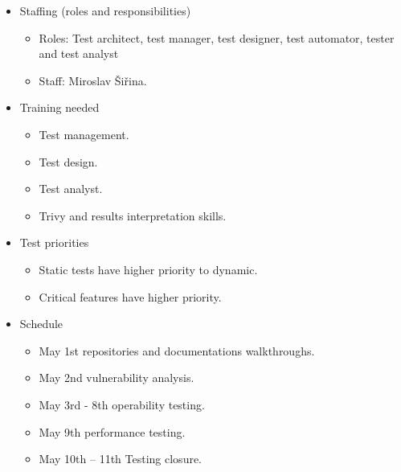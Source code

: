 \begin{itemize}
\begin{itemize}
              \item Staffing (roles and responsibilities)
                    \begin{itemize}
                        \item Roles: Test architect, test manager, test designer, test automator, tester and test analyst
                        \item Staff: Miroslav Šiřina.
                    \end{itemize}
              \item Training needed
                    \begin{itemize}
                        \item Test management.
                        \item Test design.
                        \item Test analyst.
                        \item Trivy and results interpretation skills.
                    \end{itemize}
              \item Test priorities
                    \begin{itemize}
                        \item Static tests have higher priority to dynamic.
                        \item Critical features have higher priority.
                    \end{itemize}
              \item Schedule
                    \begin{itemize}
                        \item May 1st repositories and documentations walkthroughs.
                        \item May 2nd vulnerability analysis.
                        \item May 3rd - 8th operability testing.
                        \item May 9th performance testing.
                        \item May 10th – 11th Testing closure.
                    \end{itemize}
          \end{itemize}
\end{itemize}


